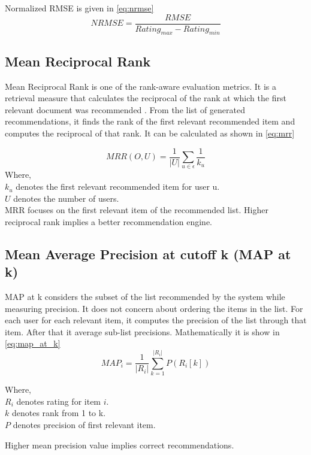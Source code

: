 \noindent Normalized RMSE is given in \autoref{eq:nrmse}
\begin{equation}
NRMSE = \frac{RMSE} {Rating_{max} - Rating_{min}}
\label{eq:nrmse}
\end{equation}



\subsection{Mean Reciprocal Rank}

Mean Reciprocal Rank is one of the rank-aware evaluation metrics.
It is a retrieval measure that calculates the reciprocal of the rank at which the first relevant document was recommended \cite{27}.
From the list of generated recommendations, it finds the rank of the first relevant recommended item and computes the reciprocal of that rank. It can be calculated as shown in \autoref{eq:mrr}

\begin{equation}
MRR(O, U) = \frac{1}{\vert U \vert} \sum_{u \in \epsilon} \frac{1} {k_{u}}
\label{eq:mrr}
\end{equation}
\noindent Where, \\
$k_{u}$ denotes the first relevant recommended item for user u. \\
$U$  denotes the number of users. \\
MRR focuses on the first relevant item of the recommended list. Higher reciprocal rank implies a better recommendation engine.


\subsection{Mean Average Precision at cutoff k (MAP at k)}
MAP at k considers the subset of the list recommended by the system while measuring precision. It does not concern about ordering the items in the list. For each user for each relevant item, it computes the precision of the list through that item. After that it average sub-list precisions. Mathematically it is show in \autoref{eq:map_at_k}
\begin{equation}
MAP_{i} = \frac{1}{\vert R_{i} \vert} \sum_{k=1}^{\vert R_{i} \vert} { P( R_{i}[k]) }
\label{eq:map_at_k}
\end{equation}

\noindent Where, \\
$R_{i}$ denotes rating for item $i$. \\
$k$ denotes rank from 1 to k.\\
$P$ denotes precision of first relevant item.

\noindent Higher mean precision value implies correct recommendations.
